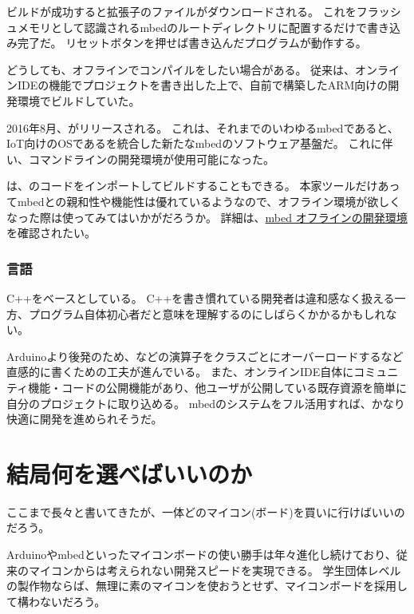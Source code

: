\documentclass[letterpaper,10pt,dvipdfmx]{sphinxmanual}
\begin{document}
ビルドが成功すると拡張子のファイルがダウンロードされる。
これをフラッシュメモリとして認識されるmbedのルートディレクトリに配置するだけで書き込み完了だ。
リセットボタンを押せば書き込んだプログラムが動作する。

どうしても、オフラインでコンパイルをしたい場合がある。
従来は、オンラインIDEの機能でプロジェクトを書き出した上で、自前で構築したARM向けの開発環境でビルドしていた。

2016年8月、がリリースされる。
これは、それまでのいわゆるmbedであると、IoT向けのOSであるを統合した新たなmbedのソフトウェア基盤だ。
これに伴い、コマンドラインの開発環境が使用可能になった。

は、のコードをインポートしてビルドすることもできる。
本家ツールだけあってmbedとの親和性や機能性は優れているようなので、オフライン環境が欲しくなった際は使ってみてはいかがだろうか。
詳細は、\href{https://developer.mbed.org/users/MACRUM/notebook/mbed-offline-development/}{mbed
オフラインの開発環境}を確認されたい。


\subsubsection{言語}
\label{\detokenize{begginers/microcontroller:id10}}
C++をベースとしている。
C++を書き慣れている開発者は違和感なく扱える一方、プログラム自体初心者だと意味を理解するのにしばらくかかるかもしれない。

Arduinoより後発のため、\sphinxcode{=}などの演算子をクラスごとにオーバーロードするなど直感的に書くための工夫が進んでいる。
また、オンラインIDE自体にコミュニティ機能・コードの公開機能があり、他ユーザが公開している既存資源を簡単に自分のプロジェクトに取り込める。
mbedのシステムをフル活用すれば、かなり快適に開発を進められそうだ。


\section{結局何を選べばいいのか}
\label{\detokenize{begginers/microcontroller:id11}}
ここまで長々と書いてきたが、一体どのマイコン(ボード)を買いに行けばいいのだろう。

Arduinoやmbedといったマイコンボードの使い勝手は年々進化し続けており、従来のマイコンからは考えられない開発スピードを実現できる。
学生団体レベルの製作物ならば、無理に素のマイコンを使おうとせず、マイコンボードを採用して構わないだろう。
\end{document}
